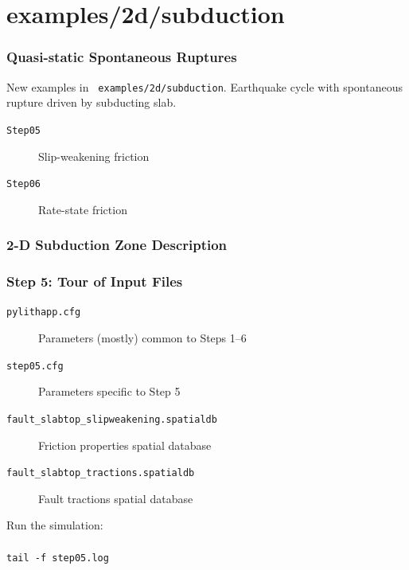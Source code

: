 \documentclass[aspectratio=169]{beamer}
\begin{document}
\section{examples/2d/subduction}

\begin{frame}
  \frametitle{Quasi-static Spontaneous Ruptures}
  \summary{}
  

  \vfill
  New examples in {\tt\color{red} examples/2d/subduction}. Earthquake
  cycle with spontaneous rupture driven by subducting slab.
  \vfill

  \begin{description}
  \item[{\tt Step05}] Slip-weakening friction
  \item[{\tt Step06}] Rate-state friction
  \end{description}
  
\end{frame}


\begin{frame}
  \frametitle{2-D Subduction Zone Description}
  \summary{}

  
\end{frame}


\begin{frame}[fragile]
  \frametitle{Step 5: Tour of Input Files}
  \summary{}

  \begin{description}
  \item[{\tt pylithapp.cfg}] Parameters (mostly) common to Steps 1--6
  \item[{\tt step05.cfg}] Parameters specific to Step 5
  \item[{\tt fault\_slabtop\_slipweakening.spatialdb}] Friction properties spatial database
  \item[{\tt fault\_slabtop\_tractions.spatialdb}] Fault tractions spatial database
  \end{description}

  \vfill

  Run the simulation:\\
   \\
  {\tt tail -f step05.log}
  
\end{frame}
\end{document}
